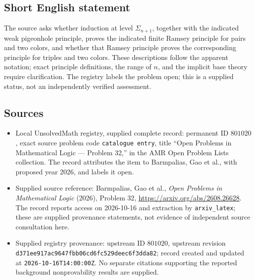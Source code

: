 \documentclass[11pt]{article}
\begin{document}
\subsection{Short English statement}
The source asks whether induction at level \(\Sigma_{n+1}\), together with the indicated weak pigeonhole principle, proves the indicated finite Ramsey principle for pairs and two colors, and whether that Ramsey principle proves the corresponding principle for triples and two colors. These descriptions follow the apparent notation; exact principle definitions, the range of \(n\), and the implicit base theory require clarification. The registry labels the problem open; this is a supplied status, not an independently verified assessment.
\subsection{Sources}
\begin{itemize}
\item Local UnsolvedMath registry, supplied complete record: permanent ID \(801020\), exact source problem code \texttt{catalogue entry}, title ``Open Problems in Mathematical Logic --- Problem 32,'' in the AMR Open Problem Lists collection. The record attributes the item to Barmpalias, Gao et al., with proposed year 2026, and labels it open.
\item Supplied source reference: Barmpalias, Gao et al., \emph{Open Problems in Mathematical Logic} (2026), Problem 32, \url{https://arxiv.org/abs/2608.26628}. The record reports access on 2026-10-16 and extraction by \texttt{arxiv\_latex}; these are supplied provenance statements, not evidence of independent source consultation here.
\item Supplied registry provenance: upstream ID \(801020\), upstream revision \texttt{d371ee917ac9647fbb06cd6fc529deec6f3dda82}; record created and updated at \texttt{2026-10-16T14:00:00Z}. No separate citations supporting the reported background nonprovability results are supplied.
\end{itemize}
\end{document}
